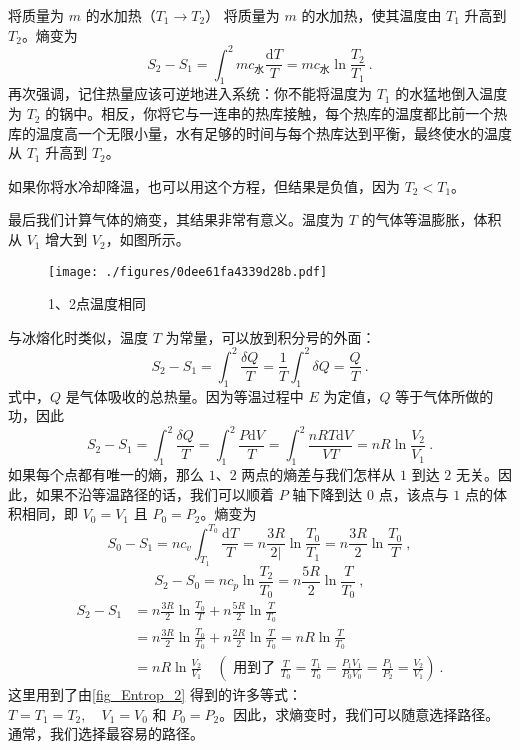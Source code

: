 \begin{example}{将质量为 $m $ 的水加热（$T_1\to T_2$）}
将质量为 $m$ 的水加热，使其温度由 $T_1$ 升高到 $T_2$。熵变为
\begin{equation}
S_2-S_1=\int_1^2{mc_{\text{水}}\frac{\text{d}T}{T}}=mc_{\text{水}}\ln \frac{T_2}{T_1}~.
\end{equation}
再次强调，记住热量应该可逆地进入系统：你不能将温度为 $T_1$ 的水猛地倒入温度为 $T_2$ 的锅中。相反，你将它与一连串的热库接触，每个热库的温度都比前一个热库的温度高一个无限小量，水有足够的时间与每个热库达到平衡，最终使水的温度从 $T_1$ 升高到 $T_2$。

如果你将水冷却降温，也可以用这个方程，但结果是负值，因为 $T_2<T_1$。

最后我们计算气体的熵变，其结果非常有意义。温度为 $T $ 的气体等温膨胀，体积从 $V_1$ 增大到 $V_2$，如图所示。
\begin{figure}[ht]
\centering
\texttt{[image: ./figures/0dee61fa4339d28b.pdf]}
\caption{1、2点温度相同} \label{fig_Entrop_2}
\end{figure}
\end{example}
与冰熔化时类似，温度 $T $ 为常量，可以放到积分号的外面：
\begin{equation}
S_2-S_1=\int_1^2{\frac{\delta Q}{T}}=\frac{1}{T}\int_1^2{\delta Q=\frac{Q}{T}}~.
\end{equation}
式中，$ Q $ 是气体吸收的总热量。因为等温过程中 $E$ 为定值，$Q$ 等于气体所做的功，因此
\begin{equation}
S_2-S_1=\int_1^2{\frac{\delta Q}{T}}=\int_1^2{\frac{P\text{d}V}{T}}=\int_1^2{\frac{nRT\text{d}V}{VT}=nR\ln \frac{V_2}{V_1}}~.
\end{equation}
如果每个点都有唯一的熵，那么 $1$、$2$ 两点的熵差与我们怎样从 $1$ 到达 $2 $ 无关。因此，如果不沿等温路径的话，我们可以顺着 $P $ 轴下降到达 $0 $ 点，该点与 $1 $ 点的体积相同，即 $V_0=V_1$ 且 $P_0=P_2$。熵变为
\begin{equation}
S_{0}-S_{1}=n c_{v} \int_{T_{1}}^{T_{0}} \frac{\mathrm{d} T}{T}=n \frac{3 R}{2 |} \ln \frac{T_{0}}{T_{1}}=n \frac{3 R}{2} \ln \frac{T_{0}}{T}~,
\end{equation}
\begin{equation}
S_{2}-S_{0}=n c_{p} \ln \frac{T_{2}}{T_{0}}=n \frac{5 R}{2} \ln \frac{T}{T_{0}}~,
\end{equation}
\begin{equation}
\begin{aligned} S_{2}-S_{1} &=n \frac{3 R}{2} \ln \frac{T_{0}}{T}+n \frac{5 R}{2} \ln \frac{T}{T_{0}} \\ &=n \frac{3 R}{2} \ln \frac{T_{0}}{T_{0}}+n \frac{2 R}{2} \ln \frac{T}{T_{0}}=n R \ln \frac{T}{T_{0}} \\ &=n R \ln \frac{V_{2}}{V_{1}} \quad\left(\text { 用到了 } \frac{T}{T_{0}}=\frac{T_{1}}{T_{0}}=\frac{P_{1} V_{1}}{P_{0} V_{0}}=\frac{P_{1}}{P_{2}}=\frac{V_{2}}{V_{1}}\right) ~.\end{aligned}
\end{equation}
这里用到了由\autoref{fig_Entrop_2} 得到的许多等式：$T=T_{1}=T_{2}, \quad V_{1}=V_{0} \text { 和 } P_{0}=P_{2}$。因此，求熵变时，我们可以随意选择路径。通常，我们选择最容易的路径。

